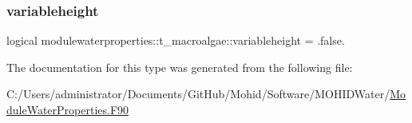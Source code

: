 \mbox{\label{structmodulewaterproperties_1_1t__macroalgae_a7c15bb9847a5a95634ca2cb94bc3ba66}} 
\subsubsection{\texorpdfstring{variableheight}{variableheight}}
{\footnotesize\ttfamily logical modulewaterproperties\+::t\+\_\+macroalgae\+::variableheight = .false.\hspace{0.3cm}{\ttfamily [private]}}



The documentation for this type was generated from the following file\+:\begin{DoxyCompactItemize}
\item 
C\+:/\+Users/administrator/\+Documents/\+Git\+Hub/\+Mohid/\+Software/\+M\+O\+H\+I\+D\+Water/\mbox{\hyperlink{_module_water_properties_8_f90}{Module\+Water\+Properties.\+F90}}\end{DoxyCompactItemize}
